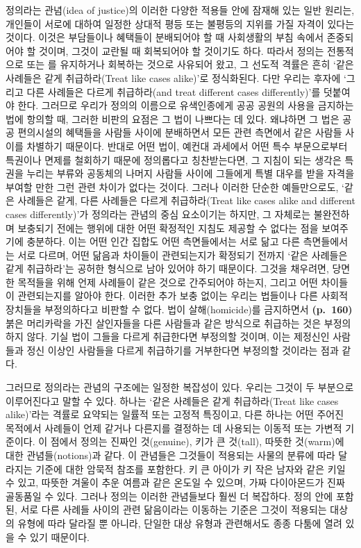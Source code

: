 정의라는 관념(idea of justice)의 이러한 다양한 적용들 안에 잠재해 있는
일반 원리는, 개인들이 서로에 대하여 일정한 상대적 평등 또는 불평등의
지위를 가질 자격이 있다는 것이다. 이것은 부담들이나 혜택들이 분배되어야
할 때 사회생활의 부침 속에서 존중되어야 할 것이며, 그것이 교란될 때
회복되어야 할 것이기도 하다. 따라서 정의는 전통적으로
 또는 를 유지하거나 회복하는
것으로 사유되어 왔고, 그 선도적 격률은 흔히 ‘같은 사례들은 같게
취급하라(Treat like cases alike)’로 정식화된다. 다만 우리는 후자에
‘그리고 다른 사례들은 다르게 취급하라(and treat different cases
differently)’를 덧붙여야 한다. 그러므로 우리가 정의의 이름으로
유색인종에게 공공 공원의 사용을 금지하는 법에 항의할 때, 그러한 비판의
요점은 그 법이 나쁘다는 데 있다. 왜냐하면 그 법은 공공 편의시설의
혜택들을 사람들 사이에 분배하면서 모든 관련 측면에서 같은 사람들 사이를
차별하기 때문이다. 반대로 어떤 법이, 예컨대 과세에서 어떤 특수
부문으로부터 특권이나 면제를 철회하기 때문에 정의롭다고 칭찬받는다면, 그
지침이 되는 생각은 특권을 누리는 부류와 공동체의 나머지 사람들 사이에
그들에게 특별 대우를 받을 자격을 부여할 만한 그런 관련 차이가 없다는
것이다. 그러나 이러한 단순한 예들만으로도, ‘같은 사례들은 같게, 다른
사례들은 다르게 취급하라(Treat like cases alike and different cases
differently)’가 정의라는 관념의 중심 요소이기는 하지만, 그 자체로는
불완전하며 보충되기 전에는 행위에 대한 어떤 확정적인 지침도 제공할 수
없다는 점을 보여주기에 충분하다. 이는 어떤 인간 집합도 어떤 측면들에서는
서로 닮고 다른 측면들에서는 서로 다르며, 어떤 닮음과 차이들이
관련되는지가 확정되기 전까지 ‘같은 사례들은 같게 취급하라’는 공허한
형식으로 남아 있어야 하기 때문이다. 그것을 채우려면, 당면한 목적들을
위해 언제 사례들이 같은 것으로 간주되어야 하는지, 그리고 어떤 차이들이
관련되는지를 알아야 한다. 이러한 추가 보충 없이는 우리는 법들이나 다른
사회적 장치들을 부정의하다고 비판할 수 없다. 법이 살해(homicide)를
금지하면서 \textbf{(p.~160)} 붉은 머리카락을 가진 살인자들을 다른
사람들과 같은 방식으로 취급하는 것은 부정의하지 않다. 기실 법이 그들을
다르게 취급한다면 부정의할 것이며, 이는 제정신인 사람들과 정신 이상인
사람들을 다르게 취급하기를 거부한다면 부정의할 것이라는 점과 같다.

그러므로 정의라는 관념의 구조에는 일정한 복잡성이 있다. 우리는 그것이 두
부분으로 이루어진다고 말할 수 있다. 하나는 ‘같은 사례들은 같게
취급하라(Treat like cases alike)’라는 격률로 요약되는 일률적 또는 고정적
특징이고, 다른 하나는 어떤 주어진 목적에서 사례들이 언제 같거나 다른지를
결정하는 데 사용되는 이동적 또는 가변적 기준이다. 이 점에서 정의는
진짜인 것(genuine), 키가 큰 것(tall), 따뜻한 것(warm)에 대한
관념들(notions)과 같다. 이 관념들은 그것들이 적용되는 사물의 분류에 따라
달라지는 기준에 대한 암묵적 참조를 포함한다. 키 큰 아이가 키 작은 남자와
같은 키일 수 있고, 따뜻한 겨울이 추운 여름과 같은 온도일 수 있으며, 가짜
다이아몬드가 진짜 골동품일 수 있다. 그러나 정의는 이러한 관념들보다 훨씬
더 복잡하다. 정의 안에 포함된, 서로 다른 사례들 사이의 관련 닮음이라는
이동하는 기준은 그것이 적용되는 대상의 유형에 따라 달라질 뿐 아니라,
단일한 대상 유형과 관련해서도 종종 다툼에 열려 있을 수 있기 때문이다.

